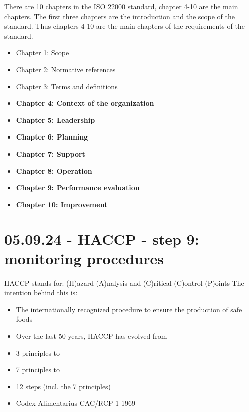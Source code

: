 There are 10 chapters in the ISO 22000 standard, chapter 4-10 are the main chapters. The first three chapters are the introduction and the scope of the standard. Thus chapters 4-10 are the main chapters of the requirements of the standard.

\begin{highlight}
    \begin{itemize}
        \item Chapter 1: Scope
        \item Chapter 2: Normative references
        \item Chapter 3: Terms and definitions
        \item \textbf{Chapter 4: Context of the organization}
        \item \textbf{Chapter 5: Leadership}
        \item \textbf{Chapter 6: Planning}
        \item \textbf{Chapter 7: Support}
        \item \textbf{Chapter 8: Operation}
        \item \textbf{Chapter 9: Performance evaluation}
        \item \textbf{Chapter 10: Improvement}
    \end{itemize}
\end{highlight}


\section{05.09.24 - HACCP - step 9: monitoring procedures}

HACCP stands for: (H)azard (A)nalysis and (C)ritical (C)ontrol (P)oints
The intention behind this is:

\begin{highlight}
    \begin{itemize}
        \item The internationally recognized procedure to ensure the production of safe foods
        \item Over the last 50 years, HACCP has evolved from
        \item 3 principles to
        \item 7 principles to
        \item 12 steps (incl. the 7 principles)
        \item Codex Alimentarius CAC/RCP 1-1969
    \end{itemize}
\end{highlight}

